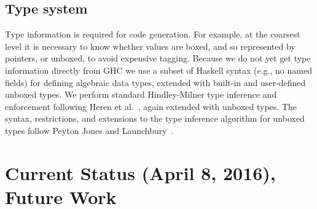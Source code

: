 \documentclass{llncs}
\begin{document}
\begin{comment}
For \emph{direct calls}, in which a known function is applied
to a number of arguments equal to its arity, \emph{stgApply} need not be
invoked: the \emph{FUN} is tail-called directly.


In addition to being in a tail call position, the gcc constraints for
generating a tail call (jump) are (approximately) that the total size of the
caller and callee arguments be equal, and the return type sizes be equal.  For
Clang the requirement is slightly more strict: caller and callee type
signatures must be the same.  These are a consequence of the C calling
convention that the caller, not callee, cleans up the stack (removes the
callee's stack frame).  However, because we maintain our own stack we can
define our own calling convention(s), so tail calls can be made to functions
of notionally differing type.  In particular, top-of-stack frames can be
adjusted in size and content without undue copying.
\end{comment}

\subsection{Type system}

Type information is required for code generation.  For example, at the
coarsest level it is necessary to know whether values are boxed, and so
represented by pointers, or unboxed, to avoid expensive tagging.  Because we
do not yet get type information directly from GHC we use a subset of Haskell
syntax (e.g., no named fields) for defining algebraic data types, extended
with built-in and user-defined unboxed types.  We perform standard
Hindley-Milner type inference and enforcement following Heren et
al.~\cite{Heren02}, again extended with unboxed types.  The syntax,
restrictions, and extensions to the type inference algorithm for unboxed types
follow Peyton Jones and Launchbury~\cite{Jones:1991}.

\section{Current Status (April 8, 2016), Future Work}
\end{document}
